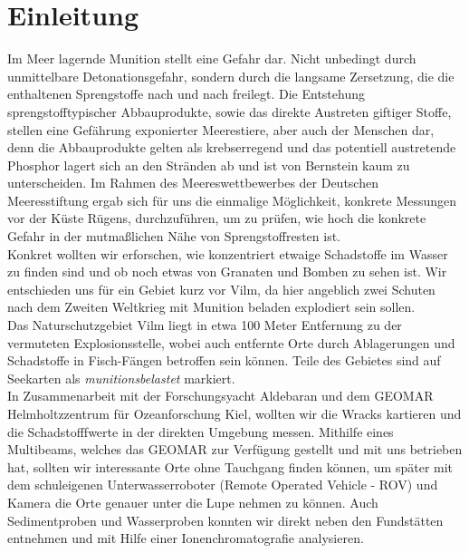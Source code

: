  

\chapter[Einleitung]{Einleitung}

Im Meer lagernde Munition stellt eine Gefahr dar. Nicht unbedingt durch unmittelbare Detonationsgefahr, 
sondern durch die langsame Zersetzung, die die enthaltenen Sprengstoffe nach und nach 
freilegt\cite{zeitbomben}. Die Entstehung sprengstofftypischer Abbauprodukte, sowie das direkte Austreten 
giftiger Stoffe, stellen eine Gefährung exponierter Meerestiere, aber auch der Menschen dar\cite{spread}, denn die
Abbauprodukte gelten als krebserregend und das potentiell austretende Phosphor lagert sich an den Stränden 
ab und ist von Bernstein kaum zu unterscheiden.  Im Rahmen des Meereswettbewerbes der Deutschen Meeresstiftung ergab sich für uns die einmalige Möglichkeit, konkrete Messungen vor der Küste Rügens, durchzuführen, um zu prüfen, wie hoch die konkrete Gefahr in der mutmaßlichen Nähe von Sprengstoffresten ist.\\

Konkret wollten wir erforschen, wie konzentriert etwaige Schadstoffe im Wasser zu finden sind und 
ob noch etwas von Granaten und Bomben zu sehen ist. Wir entschieden uns für ein Gebiet kurz vor Vilm,
da hier angeblich zwei Schuten nach dem Zweiten Weltkrieg mit Munition beladen explodiert sein sollen.\cite{schiffsschicksale}\\

Das Naturschutzgebiet Vilm liegt in etwa 100 Meter Entfernung zu der vermuteten Explosionsstelle, wobei auch 
entfernte Orte durch Ablagerungen und Schadstoffe in Fisch-Fängen betroffen sein können. Teile des Gebietes sind auf Seekarten als \emph{munitionsbelastet} markiert.\\

In Zusammenarbeit mit der Forschungsyacht Aldebaran und dem GEOMAR Helmholtzzentrum für Ozeanforschung Kiel, wollten wir die Wracks kartieren und die Schadstofffwerte in
der direkten Umgebung messen. 
Mithilfe eines 
\glqq Multibeams\grqq, welches das GEOMAR zur Verfügung gestellt und mit uns betrieben hat, sollten wir interessante Orte ohne Tauchgang finden können, um später mit dem schuleigenen Unterwasserroboter (Remote Operated Vehicle - ROV)  und Kamera die Orte genauer unter die Lupe nehmen zu können. Auch Sedimentproben und Wasserproben konnten wir direkt neben den Fundstätten entnehmen und mit Hilfe einer Ionenchromatografie analysieren.\\

